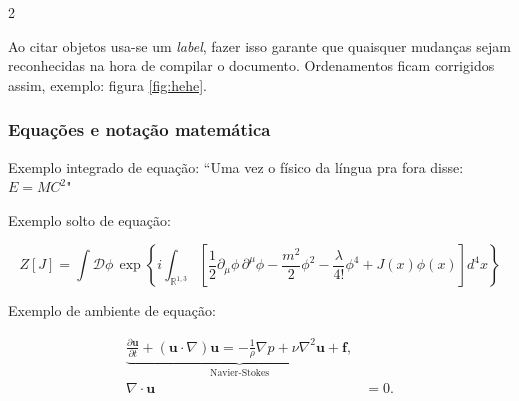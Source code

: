 \documentclass[aspectratio=169]{beamer} %
\begin{document}
\begin{frame}
\begin{multicols*}{2}
\begin{minipage}{\columnwidth}

            Ao citar objetos usa-se um \emph{label}, fazer isso
            garante que quaisquer mudanças sejam reconhecidas na hora
            de compilar o documento. Ordenamentos ficam corrigidos assim, exemplo:
            figura \ref{fig:hehe}.


        \end{minipage}

    \end{multicols*}


\end{frame}



\begin{frame}
    \frametitle{Equações e notação matemática}

    Exemplo integrado de equação:
    ``Uma vez o físico da língua pra fora disse: $E = MC^2$"

    \vspace{1em}
    Exemplo solto de equação:

    \[
            Z[J]=
            \int \mathcal{D}\phi\,
            \exp\left\{
                i\int_{\mathbb{R}^{1,3}}
                \left[
                    \frac{1}{2}\partial_\mu\phi\,\partial^\mu\phi
                    -\frac{m^2}{2}\phi^2
                    -\frac{\lambda}{4!}\phi^4
                    +J(x)\phi(x)
                    \right]d^4x
                \right\}
        \]

        \vspace{1em}
        Exemplo de ambiente de equação:


        \begin{equation}
            \begin{aligned}
                \underbrace{
                    \frac{\partial \mathbf{u}}{\partial t}
                    +(\mathbf{u}\cdot\nabla)\mathbf{u}
                    =-\frac{1}{\rho}\nabla p
                    +\nu\nabla^2\mathbf{u}
                    +\mathbf{f},
                }_{\text{Navier-Stokes}}
                \\[6pt]
                \nabla\cdot\mathbf{u}&=0.
            \end{aligned}
            \label{eq:navier}
        \end{equation}




\end{frame}
\end{document}
